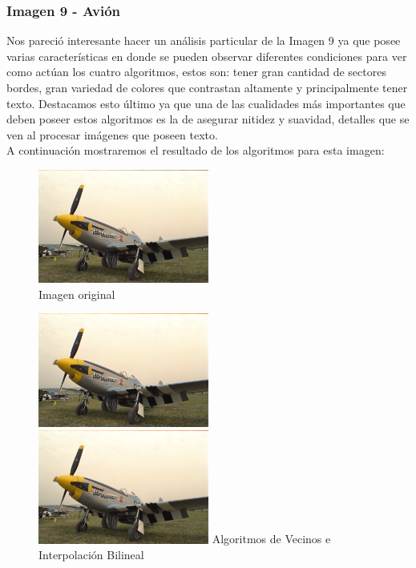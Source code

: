 {\clearpage
\subsubsection{Imagen 9 - Avión}

Nos pareció interesante hacer un análisis particular de la Imagen 9 ya que posee varias características en donde se pueden observar diferentes condiciones para ver como actúan los cuatro algoritmos, estos son: tener gran cantidad de sectores bordes, gran variedad de colores que contrastan altamente y principalmente tener texto. Destacamos esto último ya que una de las cualidades más importantes que deben poseer estos algoritmos es la de asegurar nitidez y suavidad, detalles que se ven al procesar imágenes que poseen texto. \\
A continuación mostraremos el resultado de los algoritmos para esta imagen:

\begin{figure}[h]
\begin{center}
       \includegraphics[width=0.5\textwidth]{imagenes/img9.png}
        \caption{Imagen original}
\end{center}
\end{figure}

\begin{figure}[h]
       \includegraphics[width=0.5\textwidth]{imagenes/img9_demosicing_vecino.png}
           \hfill
        \includegraphics[width=0.5\textwidth]{imagenes/img9_demosicing_bilineal.png}
        Algoritmos de Vecinos e Interpolación Bilineal
\end{figure}


}
